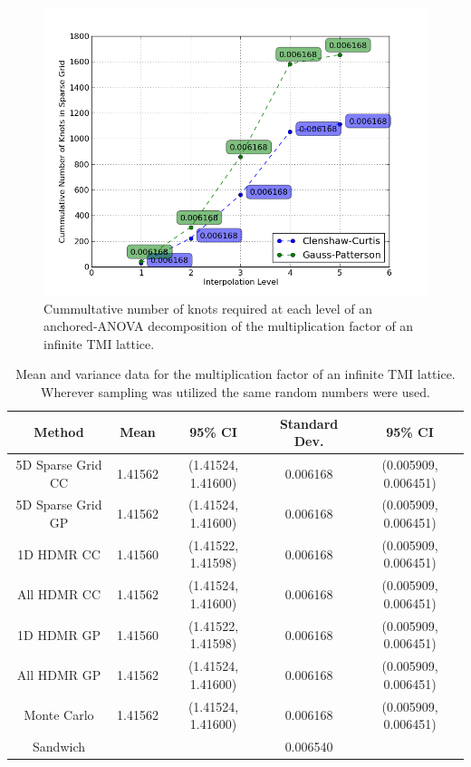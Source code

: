 
\begin{figure}
\caption{ \label{fig:kinf_numknots}
Cummultative number of knots required at each level of an anchored-\ac{ANOVA} decomposition of the multiplication factor of an infinite TMI lattice.}
 \begin{center}
  \includegraphics[scale=.75]{./Chapter3/kinf_sparse_grid_numknots.png}
 \end{center}
\end{figure}


\begin{table}[!htb] 
\caption{\label{table:kinf_mean_variance} 
Mean and variance data for the multiplication factor of an infinite TMI lattice. Wherever sampling was utilized the same random numbers were used.}
\centering
\small
\begin{tabular}{||c|c|c|c|c||} 
\hline \hline
\textbf{Method} & \textbf{Mean} & \textbf{95\% CI} & \textbf{Standard Dev.} & \textbf{95\% CI} \\ \hline
5D Sparse Grid CC      & 1.41562 & (1.41524, 1.41600) & 0.006168 & (0.005909, 0.006451) \\ \hline
5D Sparse Grid GP      & 1.41562 & (1.41524, 1.41600) & 0.006168 & (0.005909, 0.006451) \\ \hline
1D HDMR CC  & 1.41560 & (1.41522, 1.41598) & 0.006168 & (0.005909, 0.006451) \\ \hline
All HDMR CC & 1.41562 & (1.41524, 1.41600) & 0.006168 & (0.005909, 0.006451) \\ \hline
1D HDMR GP  & 1.41560 & (1.41522, 1.41598) & 0.006168 & (0.005909, 0.006451) \\ \hline
All HDMR GP & 1.41562 & (1.41524, 1.41600) & 0.006168 & (0.005909, 0.006451) \\ \hline
Monte Carlo            & 1.41562 & (1.41524, 1.41600) & 0.006168 & (0.005909, 0.006451) \\ \hline
Sandwich               &         &                    & 0.006540 &                      \\
\hline \hline
\end{tabular}
\end{table}

